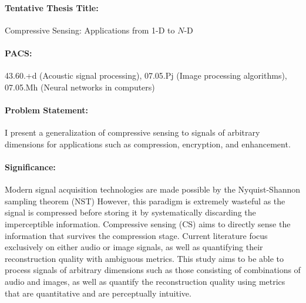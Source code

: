 \documentclass[11pt,oneside]{article}
\begin{document}
\paragraph{Tentative Thesis Title:}
Compressive Sensing: Applications from 1-D to $N$-D

\paragraph{PACS:}
43.60.+d (Acoustic signal processing), 07.05.Pj (Image processing algorithms), 07.05.Mh (Neural networks in computers)

\paragraph{Problem Statement:}
I present a generalization of compressive sensing to signals of arbitrary dimensions for applications such as compression, encryption, and enhancement.

\paragraph{Significance:}
Modern signal acquisition technologies are made possible by the Nyquist-Shannon sampling theorem (NST) However, this paradigm is extremely wasteful as the signal is compressed before storing it by systematically discarding the imperceptible information. Compressive sensing (CS) aims to directly sense the information that survives the compression stage. Current literature focus exclusively on either audio or image signals, as well as quantifying their reconstruction quality with ambiguous metrics. This study aims to be able to process signals of arbitrary dimensions such as those consisting of combinations of audio and images, as well as quantify the reconstruction quality using metrics that are quantitative and are perceptually intuitive.
\end{document}
